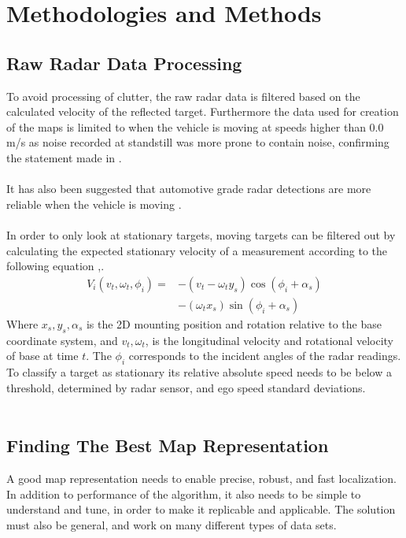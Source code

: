 \chapter{Methodologies and Methods}
\section{Raw Radar Data Processing}
To avoid processing of clutter, the raw radar data is filtered based on the calculated velocity of the reflected target. Furthermore the data used for creation of the maps is limited to when the vehicle is moving at speeds higher than 0.0 m/s as noise recorded at standstill was more prone to contain noise, confirming the statement made in \cite{narula_automotive-radar-based_2020}.
\\\\
It has also been suggested that automotive grade radar detections are more reliable when the vehicle is moving \cite{narula_automotive-radar-based_2020}.
\\\\
In order to only look at stationary targets, moving targets can be filtered out by calculating the expected stationary velocity of a measurement according to the following equation \cite{ward_vehicle_2016},\cite{yoneda_vehicle_2018}.  
\begin{equation}
\begin{aligned}
V_{i}\left(v_t,\omega_{t}, \phi_{i}\right)=&-\left(v_{t}-\omega_{t} y_{s}\right) \cos \left(\phi_{i}+\alpha_{s}\right) \\
&-\left(\omega_{t} x_{s}\right) \sin \left(\phi_{i}+\alpha_{s}\right)
\end{aligned}
\end{equation}
Where $x_s,y_s,\alpha_s$ is the 2D mounting position and rotation relative to the base coordinate system, and $v_t,\omega_t$, is the longitudinal velocity and rotational velocity of base at time $t$. The $\phi_i$ corresponds to the incident angles of the radar readings. To classify a target as stationary its relative absolute speed needs to be below a threshold, determined by radar sensor, and ego speed standard deviations.
\\\\

\section{Finding The Best Map Representation}
A good map representation needs to enable precise, robust, and fast localization. In addition to performance of the algorithm, it also needs to be simple to understand and tune, in order to make it replicable and applicable. The solution must also be general, and work on many different types of data sets.

